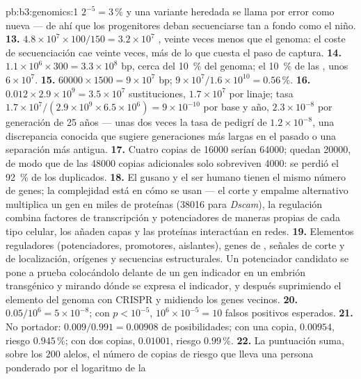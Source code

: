 \begin{solution}{pb:b3:genomics:1}
$2^{-5} = 3\,\%$ y una variante heredada se llama por error como nueva
--- de ahí que los progenitores deban secuenciarse tan a fondo como el
niño.
\textbf{13.} $4.8\times 10^{7}\times 100/150 = 3.2\times 10^{7}$
, veinte veces menos que el genoma: el coste de secuenciación cae
veinte veces, más de lo que cuesta el paso de captura.
\textbf{14.} $1.1\times 10^{6}\times 300 = 3.3\times 10^{8}$ bp, cerca
del \qty{10}{\%} del genoma; el \qty{10}{\%} de las , unos $6\times
10^{7}$.
\textbf{15.} $\num{60000}\times 1500 = 9\times 10^{7}$ bp; $9\times
10^{7}/1.6\times 10^{10} = 0.56\,\%$.
\textbf{16.} $0.012\times 2.9\times 10^{9} = 3.5\times 10^{7}$
sustituciones, $1.7\times 10^{7}$ por linaje; tasa $1.7\times
10^{7}/(2.9\times 10^{9}\times 6.5\times 10^{6}) = 9\times 10^{-10}$
por base y año, $2.3\times 10^{-8}$ por generación de 25 años --- unas
dos veces la tasa de pedigrí de $1.2\times 10^{-8}$, una discrepancia
conocida que sugiere generaciones más largas en el pasado o una
separación más antigua.
\textbf{17.} Cuatro copias de \num{16000} serían \num{64000}; quedan
\num{20000}, de modo que de las \num{48000} copias adicionales solo
sobreviven \num{4000}: se perdió el \qty{92}{\%} de los duplicados.
\textbf{18.} El gusano y el ser humano tienen el mismo número de genes;
la complejidad está en cómo se usan --- el corte y empalme alternativo
multiplica un gen en miles de proteínas (\num{38016} para \emph{Dscam}),
la regulación combina factores de transcripción y potenciadores de
maneras propias de cada tipo celular, los  añaden
capas y las proteínas interactúan en redes.
\textbf{19.} Elementos reguladores (potenciadores, promotores,
aislantes), genes de , señales de corte y de
localización, orígenes y secuencias estructurales. Un potenciador
candidato se pone a prueba colocándolo delante de un gen indicador en un
embrión transgénico y mirando dónde se expresa el indicador, y después
suprimiendo el elemento del genoma con CRISPR y midiendo los genes
vecinos.
\textbf{20.} $0.05/10^{6} = 5\times 10^{-8}$; con $p < 10^{-5}$, $10^{6}
\times 10^{-5} = 10$ falsos positivos esperados.
\textbf{21.} No portador: $0.009/0.991 = 0.00908$ de posibilidades; con
una copia, $0.00954$, riesgo $0.945\,\%$; con dos copias, $0.01001$,
riesgo $0.99\,\%$.
\textbf{22.} La puntuación suma, sobre los $200$ alelos, el número de
copias de riesgo que lleva una persona ponderado por el logaritmo de la

\end{solution}
